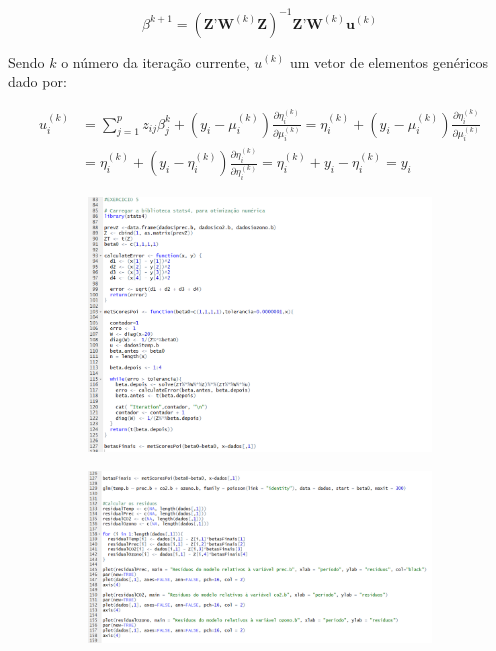\documentclass{article}
\begin{document}
				\begin{equation*}
					\beta^{k+1} = \left(\textbf{Z'W}^{(k)}\textbf{Z}\right)^{-1}  \textbf{Z'W}^{(k)}\textbf{u}^{(k)}
				\end{equation*}
			
			Sendo $k$ o número da iteração currente, $u^{(k)}$ um vetor de elementos genéricos dado por:
			
				\begin{align*}
					u_i^{(k)} &= \sum_{j=1}^{p}z_{ij}\beta_j^{k} + (y_i - \mu_i^{(k)})\frac{\partial \eta_i^{(k)}}{\partial \mu_i^{(k)}}
					= \eta_i^{(k)} + (y_i - \mu_i^{(k)})\frac{\partial \eta_i^{(k)}}{\partial \mu_i^{(k)}}\\
					&= \eta_i^{(k)} + (y_i - \eta_i^{(k)})\frac{\partial \eta_i^{(k)}}{\partial \eta_i^{(k)}}
					= \eta_i^{(k)} + y_i - \eta_i^{(k)}
					= y_i
				\end{align*}
			
				\begin{figure}[!h]
 					 \begin{subfigure}[b]{0.62\textwidth}
   						 \includegraphics[width=\textwidth]{ex5)1}
 					 \end{subfigure}
 					 \begin{subfigure}[b]{0.75\textwidth}
   						 \includegraphics[width=\textwidth]{ex5)2}
 					 \end{subfigure}
 				\end{figure}
			
\end{document}

